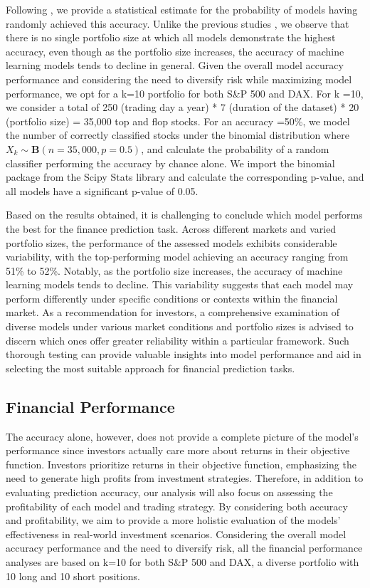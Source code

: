 \documentclass{article}
\begin{document}
Following \cite{fischer2018deep}, we provide a statistical estimate for the probability of models having randomly achieved this accuracy. Unlike the previous studies \citep{fischer2018deep, krauss2017deep}, we observe that there is no single portfolio size at which all models demonstrate the highest accuracy, even though as the portfolio size increases, the accuracy of machine learning models tends to decline in general. Given the overall model accuracy performance and considering the need to diversify risk while maximizing model performance, we opt for a k=10 portfolio for both S\&P 500 and DAX. For k =10, we consider a total of 250 (trading day a year) * 7 (duration of the dataset) * 20 (portfolio size) = 35,000 top and flop stocks. For an accuracy =50\%, we model the number of correctly classified stocks under the binomial distribution where $X_k\sim \mathbf{B}(n=35,000, p=0.5)$, and calculate the probability of a random classifier performing the accuracy by chance alone. We import the binomial package from the Scipy Stats library and calculate the corresponding p-value, and all models have a significant p-value of 0.05. 

Based on the results obtained, it is challenging to conclude which model performs the best for the finance prediction task.  Across different markets and varied portfolio sizes, the performance of the assessed models exhibits considerable variability, with the top-performing model achieving an accuracy ranging from 51\% to 52\%. Notably, as the portfolio size increases, the accuracy of machine learning models tends to decline. This variability suggests that each model may perform differently under specific conditions or contexts within the financial market. As a recommendation for investors, a comprehensive examination of diverse models under various market conditions and portfolio sizes is advised to discern which ones offer greater reliability within a particular framework. Such thorough testing can provide valuable insights into model performance and aid in selecting the most suitable approach for financial prediction tasks.

\subsection{Financial Performance}

The accuracy alone, however, does not provide a complete picture of the model's performance since investors actually care more about returns in their objective function. Investors prioritize returns in their objective function, emphasizing the need to generate high profits from investment strategies. Therefore, in addition to evaluating prediction accuracy, our analysis will also focus on assessing the profitability of each model and trading strategy. By considering both accuracy and profitability, we aim to provide a more holistic evaluation of the models' effectiveness in real-world investment scenarios. Considering the overall model accuracy performance and the need to diversify risk, all the financial performance analyses are based on k=10 for both S\&P 500 and DAX, a diverse portfolio with 10 long and 10 short positions.
\end{document}
